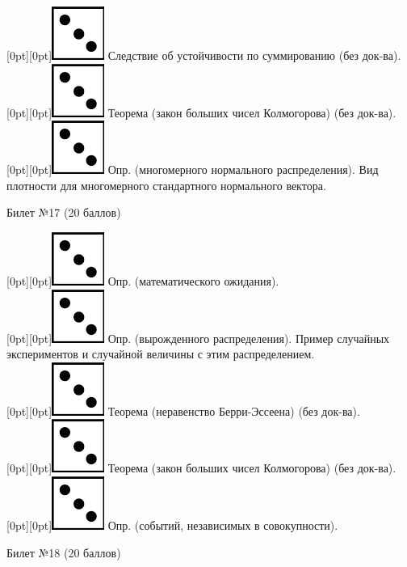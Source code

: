 \documentclass[preview]{standalone}
\begin{document}
\raisebox{-1pt}[0pt][0pt]{\includegraphics[width=0.02\linewidth]{3.png}} Следствие об устойчивости по суммированию (без док-ва). \\
\raisebox{-1pt}[0pt][0pt]{\includegraphics[width=0.02\linewidth]{3.png}} Теорема (закон больших чисел Колмогорова) (без док-ва). \\
\raisebox{-1pt}[0pt][0pt]{\includegraphics[width=0.02\linewidth]{3.png}} Опр. (многомерного нормального распределения). Вид плотности для многомерного стандартного нормального вектора. \\ 
\begin{center} {\Large Билет №17 (20 баллов)} \end{center}
\raisebox{-1pt}[0pt][0pt]{\includegraphics[width=0.02\linewidth]{3.png}} Опр. (математического ожидания). \\
\raisebox{-1pt}[0pt][0pt]{\includegraphics[width=0.02\linewidth]{3.png}} Опр. (вырожденного распределения). Пример случайных экспериментов и случайной величины с этим распределением. \\
\raisebox{-1pt}[0pt][0pt]{\includegraphics[width=0.02\linewidth]{3.png}} Теорема (неравенство Берри-Эссеена) (без док-ва). \\
\raisebox{-1pt}[0pt][0pt]{\includegraphics[width=0.02\linewidth]{3.png}} Теорема (закон больших чисел Колмогорова) (без док-ва). \\
\raisebox{-1pt}[0pt][0pt]{\includegraphics[width=0.02\linewidth]{3.png}} Опр. (событий, независимых в совокупности). \\
\begin{center} {\Large Билет №18 (20 баллов)} \end{center}
\end{document}
